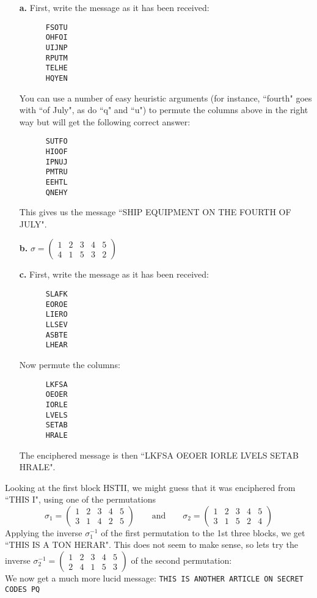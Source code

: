 \documentclass[11pt]{article}
\newcommand{\vc}[1]{\begin{pmatrix}#1\end{pmatrix}}
\begin{document}
\bigskip{}
\begin{itemize}
  \item[{\bf a.}]
    First, write the message as it has been received:
    \begin{verbatim}
      FSOTU
      OHFOI
      UIJNP
      RPUTM
      TELHE
      HQYEN
    \end{verbatim}
    You can use a number of easy heuristic arguments 
    (for instance, 
    ``fourth" goes with ``of July", as do ``q" and ``u") 
    to permute the columns above in the right way 
    but will get the following correct answer:
    \begin{verbatim}
      SUTFO
      HIOOF
      IPNUJ
      PMTRU
      EEHTL
      QNEHY
    \end{verbatim}
    This gives us the message ``SHIP EQUIPMENT ON THE FOURTH OF JULY".
  \item[{\bf b.}]
    $\sigma 
    = \vc{
        1 & 2 & 3 & 4 & 5\\
        4 & 1 & 5 & 3 & 2}$
  \item[{\bf c.}]
    First, write the message as it has been received:
    \begin{verbatim}
      SLAFK
      EOROE
      LIERO
      LLSEV
      ASBTE
      LHEAR
    \end{verbatim}
    Now permute the columns:
    \begin{verbatim}
      LKFSA
      OEOER
      IORLE
      LVELS
      SETAB
      HRALE
    \end{verbatim}
    The enciphered message is then ``LKFSA OEOER IORLE LVELS SETAB HRALE".
\end{itemize}

\bigskip{}
Looking at the first block HSTII, we might guess that 
it was enciphered from ``THIS I",
using one of the permutations
\[
  \sigma_1
    = \vc{
        1 & 2 & 3 & 4 & 5\\
        3 & 1 & 4 & 2 & 5}
  \qquad\text{and}\qquad
  \sigma_2
    = \vc{
        1 & 2 & 3 & 4 & 5\\
        3 & 1 & 5 & 2 & 4}
\]
Applying the inverse $\sigma_1^{-1}$ of 
the first permutation to the 1st three blocks, 
we get ``THIS IS A TON HERAR".
This does not seem to make sense,
so lets try the inverse $\sigma_2^{-1} = \vc{
        1 & 2 & 3 & 4 & 5\\
        2 & 4 & 1 & 5 & 3}
$ of the second permutation:\\
We now get a much more lucid message:
\verb|THIS IS ANOTHER ARTICLE ON SECRET CODES PQ|
\end{document}
